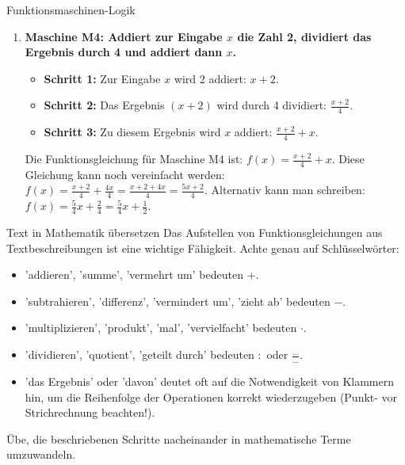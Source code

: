 \begin{loesungsumgebung}{Funktionsmaschinen-Logik}
\begin{enumerate}
    \item \textbf{Maschine M4: Addiert zur Eingabe $x$ die Zahl 2, dividiert das Ergebnis durch 4 und addiert dann $x$.}
    \begin{itemize}
        \item \textbf{Schritt 1:} Zur Eingabe $x$ wird 2 addiert: $x + 2$.
        \item \textbf{Schritt 2:} Das Ergebnis $(x+2)$ wird durch 4 dividiert: $\frac{x+2}{4}$.
        \item \textbf{Schritt 3:} Zu diesem Ergebnis wird $x$ addiert: $\frac{x+2}{4} + x$.
    \end{itemize}
    Die Funktionsgleichung für Maschine M4 ist:
    $f(x) = \frac{x+2}{4} + x$.
    Diese Gleichung kann noch vereinfacht werden:
    $f(x) = \frac{x+2}{4} + \frac{4x}{4} = \frac{x+2+4x}{4} = \frac{5x+2}{4}$.
    Alternativ kann man schreiben: $f(x) = \frac{5}{4}x + \frac{2}{4} = \frac{5}{4}x + \frac{1}{2}$.
\end{enumerate}

\begin{tippumgebung}{Text in Mathematik übersetzen}
Das Aufstellen von Funktionsgleichungen aus Textbeschreibungen ist eine wichtige Fähigkeit. Achte genau auf Schlüsselwörter:
\begin{itemize}
    \item 'addieren', 'summe', 'vermehrt um' bedeuten $+$.
    \item 'subtrahieren', 'differenz', 'vermindert um', 'zieht ab' bedeuten $-$.
    \item 'multiplizieren', 'produkt', 'mal', 'vervielfacht' bedeuten $\cdot$.
    \item 'dividieren', 'quotient', 'geteilt durch' bedeuten $: $ oder $\frac{\dots}{\dots}$.
    \item 'das Ergebnis' oder 'davon' deutet oft auf die Notwendigkeit von Klammern hin, um die Reihenfolge der Operationen korrekt wiederzugeben (Punkt- vor Strichrechnung beachten!).
\end{itemize}
Übe, die beschriebenen Schritte nacheinander in mathematische Terme umzuwandeln.
\end{tippumgebung}

\end{loesungsumgebung}

